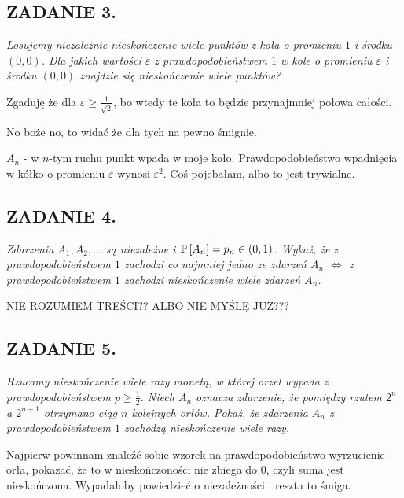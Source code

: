 \documentclass{article}
\begin{document}
\subsection*{ZADANIE 3.}
\emph{\color{yellow}Losujemy niezależnie nieskończenie wiele punktów z koła o promieniu $1$ i środku $(0, 0)$. Dla jakich wartości $\varepsilon$ z prawdopodobieństwem $1$ w kole o promieniu $\varepsilon$ i środku $(0, 0)$ znajdzie się nieskończenie wiele punktów?}
\smallskip

Zgaduję że dla $\varepsilon\geq\frac1{\sqrt2}$, bo wtedy te koła to będzie przynajmniej połowa całości.

No boże no, to widać że dla tych na pewno śmignie.

$A_n$ - w $n$-tym ruchu punkt wpada w moje koło. Prawdopodobieństwo wpadnięcia w kółko o promieniu $\varepsilon$ wynosi $\varepsilon^2$.
Coś pojebałam, albo to jest trywialne.


\subsection*{ZADANIE 4.}
\emph{\color{yellow}Zdarzenia $A_1,A_2,...$ są niezależne i $\mathbb{P}\left[A_n\right]=p_n\in(0,1)$. Wykaż, że z prawdopodobieństwem $1$ zachodzi co najmniej jedno ze zdarzeń $A_n$ $\iff$ z prawdopodobieństwem $1$ zachodzi nieskończenie wiele zdarzeń $A_n$.}
\smallskip


{\large\color{orange}NIE ROZUMIEM TREŚCI?? ALBO NIE MYŚLĘ JUŻ???}


\subsection*{ZADANIE 5.}
\emph{\color{yellow}Rzucamy nieskończenie wiele razy monetą, w której orzeł wypada z prawdopodobieństwem $p\geq\frac12$. Niech $A_n$ oznacza zdarzenie, że pomiędzy rzutem $2^n$ a $2^{n+1}$ otrzymano ciąg $n$ kolejnych orłów. Pokaż, że zdarzenia $A_n$ z prawdopodobieństwem $1$ zachodzą nieskończenie wiele razy.}
\smallskip

Najpierw powinnam znaleźć sobie wzorek na prawdopodobieństwo wyrzucienie orła, pokazać, że to w nieskończoności nie zbiega do $0$, czyli suma jest nieskończona. Wypadałoby powiedzieć o niezależności i reszta to śmiga.
\end{document}
